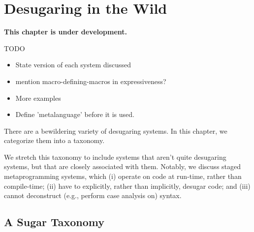 \chapter{Desugaring in the Wild}\label{chap:taxonomy}

\textbf{This chapter is under development.}

TODO
\begin{itemize}
\item State version of each system discussed
\item mention macro-defining-macros in expressiveness?
\item More examples
\item Define 'metalanguage' before it is used.
\end{itemize}

There are a bewildering variety of desugaring systems.  In this
chapter, we categorize them into a taxonomy.

We stretch this taxonomy to include systems that aren't quite
desugaring systems, but that are closely associated with
them. Notably, we discuss staged metaprogramming systems, which (i)
operate on code at run-time, rather than compile-time; (ii) have
to explicitly, rather than implicitly, desugar code; and (iii)
cannot deconstruct (e.g., perform case analysis on) syntax.

\section{A Sugar Taxonomy}

